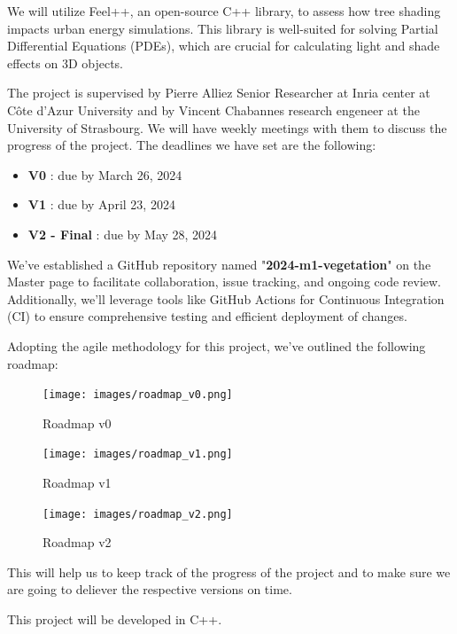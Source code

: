 \documentclass[12pt]{article}
\begin{document}
\newpage
We will utilize Feel++, an open-source C++ library, to assess how tree shading
impacts urban energy simulations. This library is well-suited for solving
Partial Differential Equations (PDEs), which are crucial for calculating
light and shade effects on 3D objects\cite{feel++}.

The project is supervised by Pierre Alliez Senior Researcher at Inria center
at Côte d'Azur University and by Vincent Chabannes research engeneer at the
University of Strasbourg. We will have weekly meetings with them to discuss
the progress of the project. The deadlines we have set are the following:

\begin{itemize}
    \item \textbf{V0} : due by March 26, 2024
    \item \textbf{V1} : due by April 23, 2024
    \item \textbf{V2 - Final} : due by May 28, 2024
\end{itemize}

We've established a GitHub repository named "\textbf{2024-m1-vegetation}" on the 
Master page to facilitate collaboration, issue tracking, and ongoing code 
review. Additionally, we'll leverage tools like GitHub Actions for Continuous 
Integration (CI) to ensure comprehensive testing and efficient deployment of 
changes.

Adopting the agile methodology for this project, we've outlined the 
following roadmap:


\begin{figure}[H]
    \centering
    \texttt{[image: images/roadmap\_v0.png]}
    \caption{Roadmap v0}
\end{figure}

\begin{figure}[H]
    \centering
    \texttt{[image: images/roadmap\_v1.png]}
    \caption{Roadmap v1}
\end{figure}

\begin{figure}[H]
    \centering
    \texttt{[image: images/roadmap\_v2.png]}
    \caption{Roadmap v2}
\end{figure}

This will help us to keep track of the progress of the project and to make sure
we are going to deliever the respective versions on time.

This project will be developed in C++.
\end{document}
